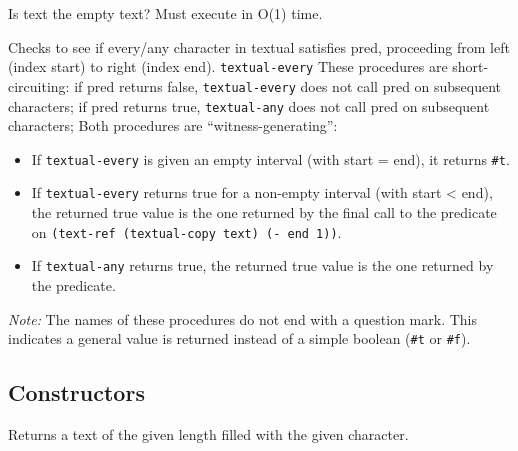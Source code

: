 \begin{entry}{%
  }

  Is text
  the empty text? Must execute in O(1) time.
\end{entry}

\begin{entry}{%
  }
 
  Checks to see if every/any character
  in textual satisfies pred, proceeding from left (index start) to
  right (index end).  \texttt{textual-every} These procedures are
  short-circuiting: if pred returns false, \texttt{textual-every} does
  not call pred on subsequent characters; if pred returns true,
  \texttt{textual-any} does not call pred on subsequent characters;
  Both procedures are ``witness-generating'':

\begin{itemize}
  \tightlist
\item If \texttt{textual-every} is given an empty interval (with start
  = end), it returns \texttt{\#t}.
\item If \texttt{textual-every} returns true for a non-empty interval
  (with start \textless{} end), the returned true value is the one
  returned by the final call to the predicate on \texttt{(text-ref\
    (textual-copy\ text)\ (-\ end\ 1))}.
\item If \texttt{textual-any} returns true, the returned true value is
  the one returned by the predicate.
\end{itemize}

\emph{Note:} The names of these procedures do not end with a question
mark. This indicates a general value is returned instead of a simple
boolean (\texttt{\#t} or \texttt{\#f}).
\end{entry}

\subsection{{Constructors}}\label{constructors}

\begin{entry}{%
  }

  Returns a
  text of the given length filled with the given character.
\end{entry}

